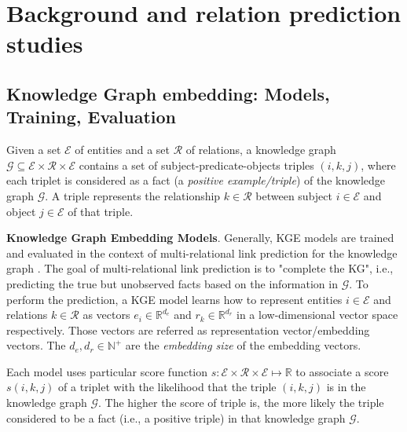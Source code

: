 
\chapter{Background and relation prediction studies}




\section[Knowledge Graph embedding (KGE)]{Knowledge Graph embedding: Models, Training, Evaluation}

Given a set $\mathcal{E}$ of entities and a set $\mathcal{R}$ of relations, a knowledge graph $\mathcal{G} \subseteq \mathcal{E} \times \mathcal{R} \times \mathcal{E}$ contains a set of subject-predicate-objects triples $(i,k,j)$, where each triplet is considered as a fact (a \textit{positive example/triple}) of the knowledge graph $\mathcal{G}$. A triple represents the relationship $k \in \mathcal{R}$ between subject $i \in \mathcal{E}$ and object $j \in \mathcal{E}$ of that triple. 
\newline

\noindent\textbf{Knowledge Graph Embedding Models}. Generally, KGE models are trained and evaluated in the context of multi-relational link prediction for the knowledge graph \citep{Ruffinelli2020You}. The goal of multi-relational link prediction is to "complete the KG", i.e., predicting the true but unobserved facts based on the information in $\mathcal{G}$. To perform the prediction, a KGE model learns how to represent entities $ i \in \mathcal{E}$ and relations $k \in \mathcal{R}$ as vectors $e_i \in \mathbb{R}^{d_e}$ and $r_k \in \mathbb{R}^{d_r}$ in a low-dimensional vector space respectively. Those vectors are referred as representation vector/embedding vectors. The $d_e, d_r \in \mathbb{N}^+$ are the \textit{embedding size} of the embedding vectors.

Each model uses particular score function $s: \mathcal{E} \times \mathcal{R} \times \mathcal{E} \mapsto \mathbb{R}$ to associate a score $s(i,k,j)$ of a triplet with the likelihood that the triple $(i,k,j)$ is in the knowledge graph $\mathcal{G}$. The higher the score of triple is, the more likely the triple considered to be a fact (i.e., a positive triple) in that knowledge graph $\mathcal{G}$. 

